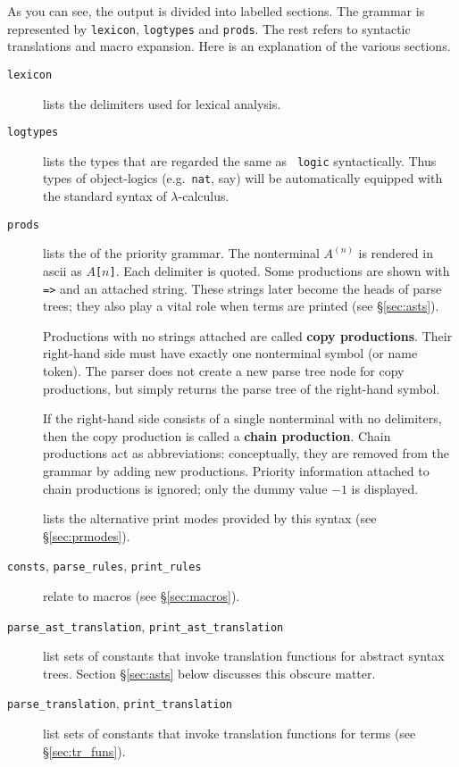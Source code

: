 As you can see, the output is divided into labelled sections.  The grammar
is represented by {\tt lexicon}, {\tt logtypes} and {\tt prods}.  The rest
refers to syntactic translations and macro expansion.  Here is an
explanation of the various sections.
\begin{description}
  \item[{\tt lexicon}] lists the delimiters used for lexical
    analysis.

  \item[{\tt logtypes}] lists the types that are regarded the same as {\tt
    logic} syntactically.  Thus types of object-logics (e.g.\ {\tt nat}, say)
    will be automatically equipped with the standard syntax of
    $\lambda$-calculus.

  \item[{\tt prods}] lists the  of the priority grammar.
    The nonterminal $A^{(n)}$ is rendered in {\sc ascii} as {\tt $A$[$n$]}.
    Each delimiter is quoted.  Some productions are shown with {\tt =>} and
    an attached string.  These strings later become the heads of parse
    trees; they also play a vital role when terms are printed (see
    \S\ref{sec:asts}).

    Productions with no strings attached are called {\bf copy
      productions}.  Their right-hand side must
    have exactly one nonterminal symbol (or name token).  The parser does
    not create a new parse tree node for copy productions, but simply
    returns the parse tree of the right-hand symbol.

    If the right-hand side consists of a single nonterminal with no
    delimiters, then the copy production is called a {\bf chain
      production}.  Chain productions act as abbreviations:
    conceptually, they are removed from the grammar by adding new
    productions.  Priority information attached to chain productions is
    ignored; only the dummy value $-1$ is displayed.
    
  \item[] lists the alternative print modes
    provided by this syntax (see \S\ref{sec:prmodes}).

  \item[{\tt consts}, {\tt parse_rules}, {\tt print_rules}]
    relate to macros (see \S\ref{sec:macros}).

  \item[{\tt parse_ast_translation}, {\tt print_ast_translation}]
    list sets of constants that invoke translation functions for abstract
    syntax trees.  Section \S\ref{sec:asts} below discusses this obscure
    matter.

  \item[{\tt parse_translation}, {\tt print_translation}] list sets
    of constants that invoke translation functions for terms (see
    \S\ref{sec:tr_funs}).
\end{description}


